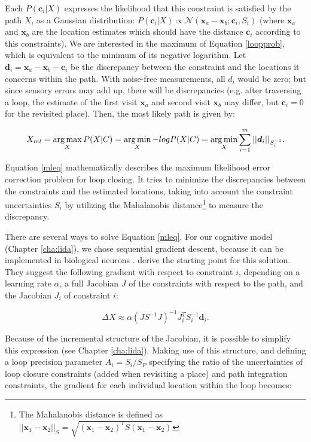 Each $P(\bm c_i|X)$ expresses the likelihood that this constraint is satisfied by the path $X$, as a Gaussian distribution: $P(\bm c_i|X)\propto\mathcal{N}(\bm x_a-\bm x_b;\bm c_i, S_i)$ (where $\bm x_a$ and $\bm x_b$ are the location estimates which should have the distance $\bm c_i$ according to this constraints). We are interested in the maximum of Equation \ref{loopprob}, which is equivalent to the minimum of its negative logarithm. Let $\bm d_i=\bm x_a - \bm x_b - \bm c_i$ be the discrepancy between the constraint and the locations it concerns within the path. With noise-free measurements, all $d_i$ would be zero; but since sensory errors may add up, there will be discrepancies (e.g. after traversing a loop, the estimate of the first visit $\bm x_a$ and second visit $\bm x_b$ may differ, but $\bm c_i=0$ for the revisited place). Then, the most likely path is given by:

\begin{equation}
\label{mleq}
X_{ml} = \operatorname*{arg\,max}_X P(X|C) = \operatorname*{arg\,min}_X -log P(X|C) = \operatorname*{arg\,min}_X \sum_{i=1}^{m} ||\bm d_i||_{S_i^{-1}}.
\end{equation}

Equation \ref{mleq} mathematically describes the maximum likelihood error correction problem for loop closing. It tries to minimize the discrepancies between the constraints and the estimated locations, taking into account the constraint uncertainties $S_i$ by utilizing the Mahalanobis distance\footnote{The Mahalanobis distance is defined as $||\bm x_1-\bm x_2||_S = \sqrt{(\bm x_1-\bm x_2)^TS(\bm x_1-\bm x_2)}$} to measure the discrepancy.

There are several ways to solve Equation \ref{mleq}. For our cognitive model (Chapter \ref{cha:lida}), we chose sequential gradient descent, because it can be implemented in biological neurons \citep{bengio2015towards}. \cite{olson2006fast} derive the starting point for this solution. They suggest the following gradient with respect to constraint $i$, depending on a learning rate $\alpha$, a full Jacobian $J$ of the constraints with respect to the path, and the Jacobian $J_i$ of constraint $i$:

\begin{equation}
\label{gradient}
\Delta X \approx \alpha (JS^{-1}J)^{-1}J_i^TS_i^{-1} \bm d_i.
\end{equation}

Because of the incremental structure of the Jacobian, it is possible to simplify this expression (see Chapter \ref{cha:lida}). Making use of this structure, and defining a loop precision parameter $A_i=S_i/S_P$ specifying the ratio of the uncertainties of loop closure constraints (added when revisiting a place) and path integration constraints, the gradient for each individual location within the loop becomes:

